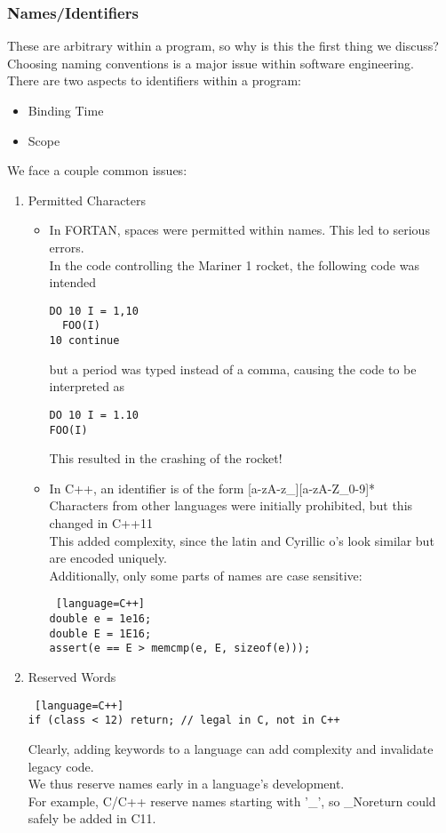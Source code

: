 \documentclass[../../lecture_notes.tex]{subfiles}
\begin{document}
\subsubsection*{Names/Identifiers}
These are arbitrary within a program, so why is this the first thing we discuss?\\
\indent Choosing naming conventions is a major issue within software engineering.\\
There are two aspects to identifiers within a program:
\begin{itemize} [itemsep=0mm]
	\item Binding Time
	\item Scope
\end{itemize}
We face a couple common issues:
	\begin{enumerate} [itemsep=0mm]
		\item Permitted Characters
			\begin{itemize} [itemsep=0mm]
				\item In FORTAN, spaces were permitted within names.  This led to serious errors.\\
				In the code controlling the Mariner 1 rocket, the following code was intended
				\begin{lstlisting}[language=FORTRAN]
DO 10 I = 1,10
  FOO(I)
10 continue
				\end{lstlisting}
				but a period was typed instead of a comma, causing the code to be interpreted as
				\begin{lstlisting}[language=FORTRAN]
DO 10 I = 1.10
FOO(I)
				\end{lstlisting}
				This resulted in the crashing of the rocket!
			\item In C++, an identifier is of the form [a-zA-z\_][a-zA-Z\_0-9]*\\
				Characters from other languages were initially prohibited, but this changed in C++11\\
				This added complexity, since the latin and Cyrillic o's look similar but are encoded uniquely.\\
				Additionally, only some parts of names are case sensitive:
				\begin{lstlisting} [language=C++]
double e = 1e16;
double E = 1E16;
assert(e == E > memcmp(e, E, sizeof(e)));
				\end{lstlisting}
			\end{itemize}
		\item Reserved Words
			\begin{lstlisting} [language=C++]
if (class < 12) return; // legal in C, not in C++
			\end{lstlisting}
			Clearly, adding keywords to a language can add complexity and invalidate legacy code.\\
			We thus reserve names early in a language's development.\\
			For example, C/C++ reserve names starting with '\_',  so \_Noreturn could safely be added in C11.\\
		\end{enumerate}
\end{document}
